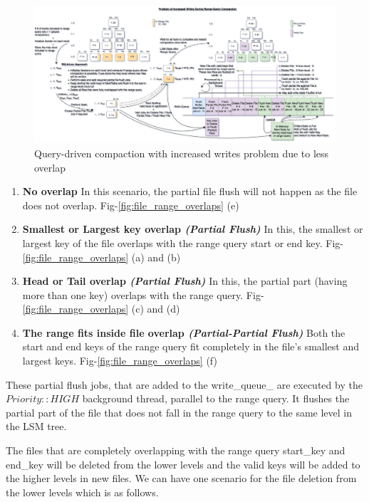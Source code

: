 \begin{figure}
    \includegraphics[scale=0.12]{Figures/RQ-driven problem of increased writes.png}
    \caption{Query-driven compaction with increased writes problem due to less overlap}\label{fig:query-driven_compaction_with_increased_writes}
\end{figure}

\begin{enumerate}
    \item \textbf{No overlap} In this scenario, the partial file flush will not happen as the file does not overlap. 
    Fig-\ref{fig:file_range_overlaps} (e)
    \item \textbf{Smallest or Largest key overlap \textit{(Partial Flush)}} In this, the smallest or largest key of the 
    file overlaps with the range query start or end key. Fig-\ref{fig:file_range_overlaps} (a) and (b)
    \item \textbf{Head or Tail overlap \textit{(Partial Flush)}} In this, the partial part (having more than one key) 
    overlaps with the range query. Fig-\ref{fig:file_range_overlaps} (c) and (d)
    \item \textbf{The range fits inside file overlap \textit{(Partial-Partial Flush)}} Both the start and end keys of 
    the range query fit completely in the file's smallest and largest keys. Fig-\ref{fig:file_range_overlaps} (f)
\end{enumerate}

These partial flush jobs, that are added to the write\_queue\_ are executed by the $Priority::HIGH$ background thread, 
parallel to the range query. It flushes the partial part of the file that does not fall in the range query to the same 
level in the LSM tree.

The files that are completely overlapping with the range query start\_key and end\_key will be deleted from the lower 
levels and the valid keys will be added to the higher levels in new files. We can have one scenario for the file 
deletion from the lower levels which is as follows.


